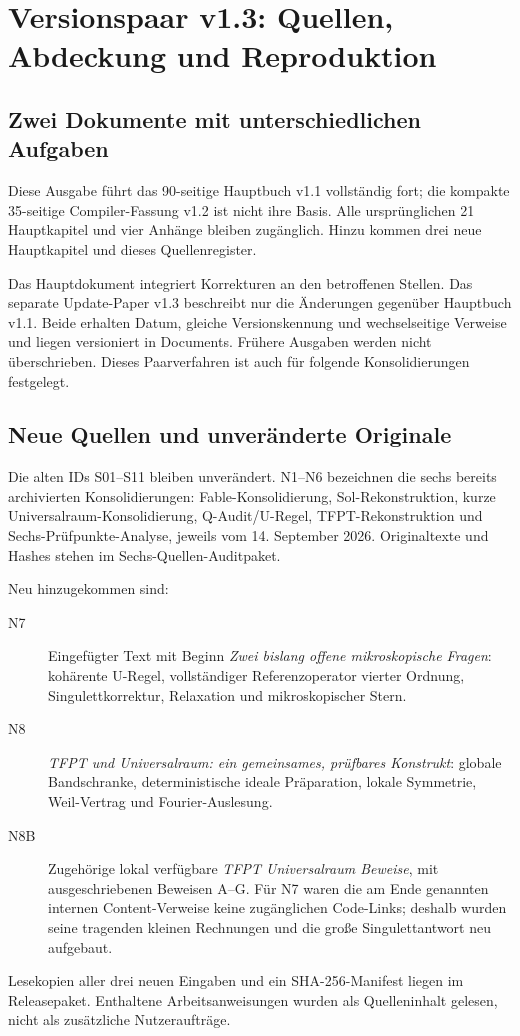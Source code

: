 \chapter{Versionspaar v1.3: Quellen, Abdeckung und Reproduktion}
\label{app:release13}
\section{Zwei Dokumente mit unterschiedlichen Aufgaben}
Diese Ausgabe führt das 90-seitige Hauptbuch v1.1 vollständig fort; die kompakte 35-seitige Compiler-Fassung v1.2 ist nicht ihre Basis. Alle ursprünglichen 21 Hauptkapitel und vier Anhänge bleiben zugänglich. Hinzu kommen drei neue Hauptkapitel und dieses Quellenregister.

Das Hauptdokument integriert Korrekturen an den betroffenen Stellen. Das separate Update-Paper v1.3 beschreibt nur die Änderungen gegenüber Hauptbuch v1.1. Beide erhalten Datum, gleiche Versionskennung und wechselseitige Verweise und liegen versioniert in Documents. Frühere Ausgaben werden nicht überschrieben. Dieses Paarverfahren ist auch für folgende Konsolidierungen festgelegt.

\section{Neue Quellen und unveränderte Originale}
Die alten IDs S01--S11 bleiben unverändert. N1--N6 bezeichnen die sechs bereits archivierten Konsolidierungen: Fable-Konsolidierung, Sol-Rekonstruktion, kurze Universalraum-Konsolidierung, Q-Audit/U-Regel, TFPT-Rekonstruktion und Sechs-Prüfpunkte-Analyse, jeweils vom 14. September 2026. Originaltexte und Hashes stehen im Sechs-Quellen-Auditpaket.

Neu hinzugekommen sind:
\begin{description}
\item[N7] Eingefügter Text mit Beginn \emph{Zwei bislang offene mikroskopische Fragen}: kohärente U-Regel, vollständiger Referenzoperator vierter Ordnung, Singulettkorrektur, Relaxation und mikroskopischer Stern.
\item[N8] \emph{TFPT und Universalraum: ein gemeinsames, prüfbares Konstrukt}: globale Bandschranke, deterministische ideale Präparation, lokale Symmetrie, Weil-Vertrag und Fourier-Auslesung.
\item[N8B] Zugehörige lokal verfügbare \emph{TFPT Universalraum Beweise}, mit ausgeschriebenen Beweisen A--G. Für N7 waren die am Ende genannten internen Content-Verweise keine zugänglichen Code-Links; deshalb wurden seine tragenden kleinen Rechnungen und die große Singulettantwort neu aufgebaut.
\end{description}
Lesekopien aller drei neuen Eingaben und ein SHA-256-Manifest liegen im Releasepaket. Enthaltene Arbeitsanweisungen wurden als Quelleninhalt gelesen, nicht als zusätzliche Nutzeraufträge.

